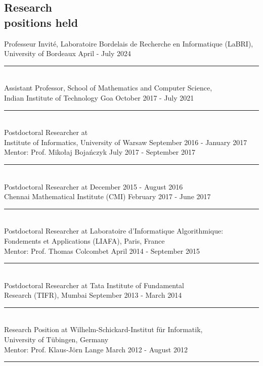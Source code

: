 \documentclass[margin]{res}
\begin{document}
\begin{resume}
\section{Research \\ positions held}
					Professeur Invit\'e, Laboratoire Bordelais de Recherche en Informatique (LaBRI), \\
					University of Bordeaux \hfill April - July 2024 \\
					\noindent\rule{13cm}{0.4pt} \\
					Assistant Professor, School of Mathematics and Computer Science, \\
					Indian Institute of Technology Goa  \hfill October 2017 - July 2021\\
					\noindent\rule{13cm}{0.4pt} \\
					Postdoctoral Researcher at \hfill  \\
					Institute of Informatics, University of Warsaw \hfill September 2016 - January 2017 \\
					Mentor: Prof. Miko\l{}aj Boja\'nczyk \hfill July 2017 - September 2017 \\
					\noindent\rule{13cm}{0.4pt} \\
					Postdoctoral Researcher at 	\hfill December 2015 - August 2016 \\
					Chennai Mathematical Institute (CMI)  \hfill February 2017 - June 2017 \\
					\noindent\rule{13cm}{0.4pt} \\
					Postdoctoral Researcher  at Laboratoire d{'}Informatique Algorithmique: \\
					Fondements et Applications (LIAFA),	Paris, France  \\
					Mentor: Prof. Thomas Colcombet \hfill April 2014 - September 2015\\
					\noindent\rule{13cm}{0.4pt} \\
					Postdoctoral Researcher  at Tata Institute of  Fundamental \\
					Research (TIFR), Mumbai	\hfill	September 2013 - March 2014
					\noindent\rule{13cm}{0.4pt} \\					
					Research Position at Wilhelm-Schickard-Institut f\"ur Informatik, \\
					University of T\"ubingen, Germany \\
					Mentor: Prof. Klaus-J\"orn Lange \hfill March 2012 - August 2012 \\
					\noindent\rule{13cm}{0.4pt}



\end{resume}
\end{document}
